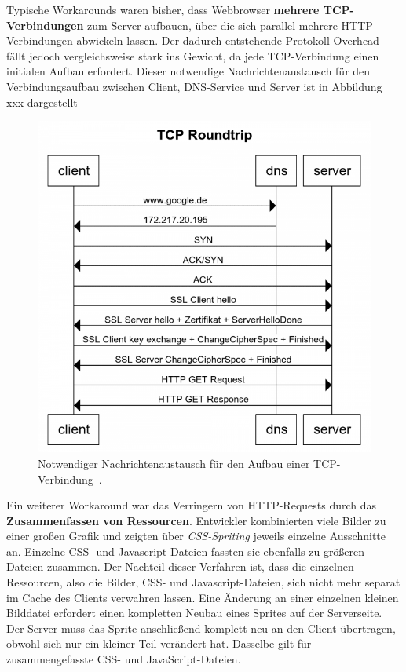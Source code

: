 \documentclass[a4paper, justified, notoc]{tufte-handout} %
\begin{document}
Typische Workarounds waren bisher, dass Webbrowser \textbf{mehrere TCP-Verbindungen} zum Server aufbauen, über die sich parallel mehrere HTTP-Verbindungen abwickeln lassen. Der dadurch entstehende Protokoll-Overhead fällt jedoch vergleichsweise stark ins Gewicht, da jede TCP-Verbindung einen initialen Aufbau erfordert. Dieser notwendige Nachrichtenaustausch für den Verbindungsaufbau zwischen Client, DNS-Service und Server ist in Abbildung xxx dargestellt

\begin{figure}%
	\centering
  \includegraphics[width=1\textwidth]{./figures/tcp_verbindungsaufbau.png}
  \caption{Notwendiger Nachrichtenaustausch für den Aufbau einer TCP-Verbindung~\citep{weinschenkler:2017}.}
  \label{fig:tcp_roundtrip}
\end{figure}
 
Ein weiterer Workaround war das Verringern von HTTP-Requests durch das \textbf{Zusammenfassen von Ressourcen}. Entwickler kombinierten viele Bilder zu einer großen Grafik und zeigten über \emph{CSS-Spriting} jeweils einzelne Ausschnitte an. Einzelne CSS- und Javascript-Dateien fassten sie ebenfalls zu größeren Dateien zusammen. Der Nachteil dieser Verfahren ist, dass die einzelnen Ressourcen, also die Bilder, CSS- und Javascript-Dateien, sich nicht mehr separat im Cache des Clients verwahren lassen. Eine Änderung an einer einzelnen kleinen Bilddatei erfordert einen kompletten Neubau eines Sprites auf der Serverseite. Der Server muss das Sprite anschließend komplett neu an den Client übertragen, obwohl sich nur ein kleiner Teil verändert hat. Dasselbe gilt für zusammengefasste CSS- und JavaScript-Dateien.
\end{document}
